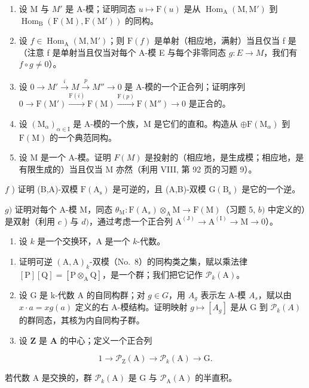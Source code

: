 \begin{enumerate}
\def\labelenumi{\alph{enumi})}
\item
  设 M 与 \(M'\) 是 A-模；证明同态 \(u \mapsto \mathrm{F}(u)\) 是从 \(\operatorname{Hom}_{\mathrm{A}}(\mathrm{M}, \mathrm{M}')\) 到 \(\operatorname{Hom}_{\mathrm{B}}(\mathrm{F}(\mathrm{M}), \mathrm{F}(\mathrm{M}'))\) 的同构。
\item
  设 \(f \in \operatorname{Hom}_{\mathrm{A}}(\mathrm{M}, \mathrm{M}')\)；则 \(\mathrm{F}(f)\) 是单射（相应地，满射）当且仅当 f 是（注意 f 是单射当且仅当对每个 A-模 E 与每个非零同态 \(g : E \to M\)，我们有 \(f \circ g \neq 0\)）。
\item
  设 \(0 \to M' \xrightarrow{i} M \xrightarrow{p} M'' \to 0\) 是 A-模的一个正合列；证明序列 \(0 \to \mathrm{F}(\mathrm{M}') \xrightarrow{\mathrm{F}(i)} \mathrm{F}(\mathrm{M}) \xrightarrow{\mathrm{F}(p)} \mathrm{F}(\mathrm{M}'') \to 0\) 是正合的。
\item
  设 \((\mathrm{M}_{\alpha})_{\alpha\in\mathrm{I}}\) 是 A-模的一个族，M 是它们的直和。构造从 \(\oplus\mathrm{F}(\mathrm{M}_{\alpha})\) 到 \(\mathrm{F}(\mathrm{M})\) 的一个典范同构。
\item
  设 M 是一个 A-模。证明 \(F(M)\) 是投射的（相应地，是生成模；相应地，是有限生成的）当且仅当 M 亦然（利用 VIII, 第 92 页的习题 9）。
\end{enumerate}

\(f\) ) 证明 (B,A)-双模 \(\mathrm{F(A_s)}\) 是可逆的，且 (A,B)-双模 \(\mathrm{G(B_s)}\) 是它的一个逆。

\(g)\) 证明对每个 A-模 M，同态 \(\theta_{\mathrm{M}}: \mathrm{F}(\mathrm{A}_s) \otimes_{\mathrm{A}} \mathrm{M} \to \mathrm{F}(\mathrm{M})\)（习题 5, \(b)\) 中定义的）是双射（利用 \(c\) ) 与 \(d)\)，通过考虑一个正合列 \(\mathrm{A}^{(\mathrm{J})} \to \mathrm{A}^{(\mathrm{I})} \to \mathrm{M} \to 0\)）。

\begin{enumerate}
\def\labelenumi{\arabic{enumi})}
\setcounter{enumi}{7}
\tightlist
\item
  设 \(k\) 是一个交换环，A 是一个 \(k\)-代数。
\end{enumerate}

\begin{enumerate}
\def\labelenumi{\alph{enumi})}
\item
  证明可逆 \((\mathrm{A},\mathrm{A})_k\)-双模（No.~8）的同构类之集，赋以乘法律 \([\mathrm{P}][\mathrm{Q}] = [\mathrm{P}\otimes_{\mathrm{A}}\mathrm{Q}]\)，是一个群；我们把它记作 \(\mathcal{P}_k(\mathrm{A})\)。
\item
  设 G 是 k-代数 A 的自同构群；对 \(g \in G\)，用 \(A_{g}\) 表示左 A-模 \(A_{s}\)，赋以由 \(x \cdot a = x g(a)\) 定义的右 A-模结构。证明映射 \(g \mapsto [A_{g}]\) 是从 G 到 \(\mathcal{P}_{k}(A)\) 的群同态，其核为内自同构子群。
\item
  设 \(\mathbf{Z}\) 是 \(\mathbf{A}\) 的中心；定义一个正合列
\end{enumerate}

\[
1 \to \mathcal {P} _ {\mathrm{Z}} (\mathrm{A}) \to \mathcal {P} _ {k} (\mathrm{A}) \to \mathrm{G}.
\]

若代数 A 是交换的，群 \(\mathcal{P}_{k}(\mathrm{A})\) 是 G 与 \(\mathcal{P}_{\mathrm{A}}(\mathrm{A})\) 的半直积。


